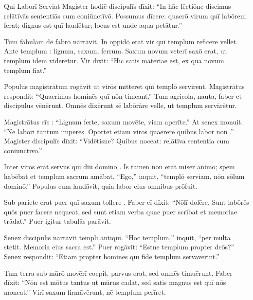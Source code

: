 \documentclass[12pt]{nextbook}
\begin{document}
\begin{readersection}{Qui Laborī Serviat}
Magister hodiē discipulīs dīxit: “In hāc lēctiōne discimus relātīvās sententiās cum coniūnctīvō. Possumus dīcere: quaerō virum quī labōrem ferat; dignus est quī laudētur; locus est unde aqua petātur.”

Tum fābulam dē fabrō nārrāvit. In oppidō erat vir quī templum reficere vellet. Ante templum  : lignum, saxum, ferrum. Saxum novum veterī saxō  erat, ut templum idem viderētur. Vir dīxit: “Hīc satis māteriae est, ex quā novum templum fiat.”

Populus magistrātum rogāvit ut virōs mitteret quī templō servirent. Magistrātus respondit: “Quaerimus hominēs quī  nōn timeant.” Tum agricola, nauta, faber et discipulus vēnērunt. Omnēs dīxērunt sē labōrāre velle, ut templum servārētur.

Magistrātus eīs : “Lignum ferte, saxum movēte, viam aperīte.” At senex monuit: “Nē labōrī tantum imperēs. Oportet etiam virōs quaerere quibus labor nōn .” Magister discipulīs dīxit: “Vidētisne? Quibus noceat: relātīva sententia cum coniūnctīvō.”

Inter virōs erat servus quī diū dominō . Is tamen nōn erat miser animō; spem habēbat et templum sacrum amābat. “Ego,” inquit, “templō serviam, nōn sōlum dominō.” Populus eum laudāvit, quia labor eius omnibus prōfuit.

Sub pariete erat puer quī saxum tollere . Faber eī dīxit: “Nōlī dolēre. Sunt labōrēs quōs puer facere nequeat, sed sunt etiam verba quae puer scrībat et memoriae trādat.” Puer igitur tabulās parāvit.

Senex discipulīs narrāvit  templī antīquī. “Hoc templum,” inquit, “per multa  stetit. Memoria eius sacra est.” Puer rogāvit: “Estne templum  propter deōs?” Senex respondit: “Etiam propter hominēs quī fidē templum servāvērint.”

Tum terra sub mūrō movērī coepit.  parvus erat, sed omnēs timuērunt. Faber dīxit: “Nōn est mōtus tantus ut mūrus cadat, sed satis magnus est quī nōs moneat.” Virī saxum firmāvērunt, nē templum perīret.


\end{readersection}
\end{document}

